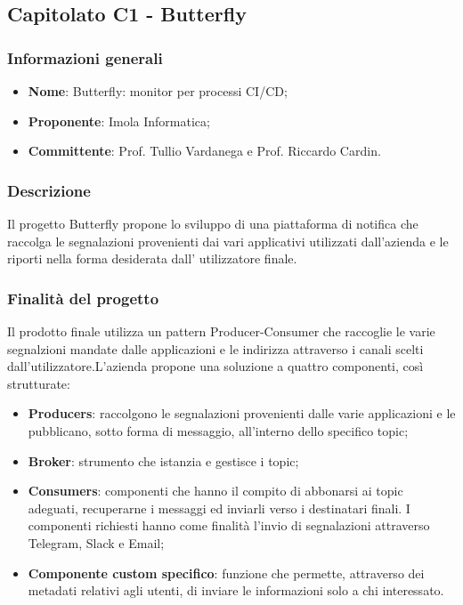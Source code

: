 \subsection{Capitolato C1 - Butterfly}
\subsubsection{Informazioni generali}
\begin{itemize}
\item
\textbf{Nome}: Butterfly: monitor per processi CI/CD;
\item
\textbf{Proponente}: Imola Informatica;
\item
\textbf{Committente}: Prof. Tullio Vardanega e Prof. Riccardo Cardin.
\end{itemize}
\subsubsection{Descrizione}
Il progetto Butterfly propone lo sviluppo di una piattaforma di notifica che raccolga le segnalazioni provenienti dai vari applicativi utilizzati dall’azienda e le riporti nella forma desiderata dall’ utilizzatore finale.

\subsubsection{Finalità del progetto}
Il prodotto finale utilizza un pattern Producer-Consumer che raccoglie le varie segnalzioni mandate dalle applicazioni e le indirizza attraverso i canali scelti dall’utilizzatore.L’azienda propone una soluzione a quattro componenti, così strutturate:
\begin{itemize}
	\item \textbf{Producers}: raccolgono le segnalazioni provenienti dalle varie applicazioni e le pubblicano, sotto forma di messaggio, all’interno dello specifico topic;
	\item \textbf{Broker}: strumento che istanzia e gestisce i topic;
	\item \textbf{Consumers}: componenti che hanno il compito di abbonarsi ai topic adeguati, recuperarne i messaggi ed inviarli verso i destinatari finali. I componenti richiesti hanno come finalità l’invio di segnalazioni attraverso Telegram, Slack e Email;
    \item \textbf{Componente custom specifico}: funzione che permette, attraverso dei metadati relativi agli utenti, di inviare le informazioni solo a chi interessato.
\end{itemize}
